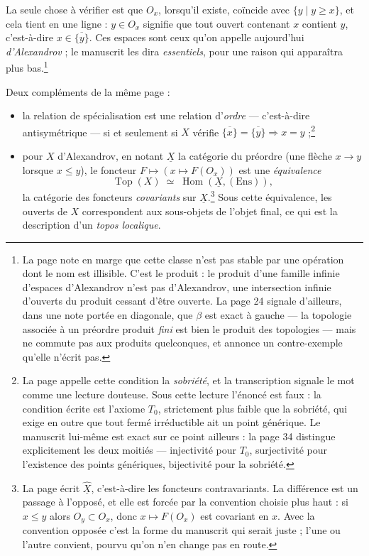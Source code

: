 \documentclass[11pt,a4paper]{article}
\begin{document}
La seule chose à vérifier est que $O_{x}$, lorsqu'il existe, coïncide avec
$\{y \mid y \geq x\}$, et cela tient en une ligne : $y \in O_{x}$ signifie que
tout ouvert contenant $x$ contient $y$, c'est-à-dire $x \in \overline{\{y\}}$.
Ces espaces sont ceux qu'on appelle aujourd'hui \emph{d'Alexandrov} ; le
manuscrit les dira \emph{essentiels}, pour une raison qui apparaîtra plus
bas.\footnote{La page note en marge que cette classe n'est pas stable par une
opération dont le nom est illisible. C'est le produit : le produit d'une
famille infinie d'espaces d'Alexandrov n'est pas d'Alexandrov, une
intersection infinie d'ouverts du produit cessant d'être ouverte. La page 24
signale d'ailleurs, dans une note portée en diagonale, que $\beta$ est exact à
gauche — la topologie associée à un préordre produit \emph{fini} est bien le
produit des topologies — mais ne commute pas aux produits quelconques, et
annonce un contre-exemple qu'elle n'écrit pas.}

Deux compléments de la même page :

\begin{itemize}
\item la relation de spécialisation est une relation d'\emph{ordre} — c'est-à-dire
antisymétrique — si et seulement si $X$ vérifie $\overline{\{x\}} =
\overline{\{y\}} \Rightarrow x = y$ ;\footnote{La page appelle cette condition
la \emph{sobriété}, et la transcription signale le mot comme une lecture
douteuse. Sous cette lecture l'énoncé est faux : la condition écrite est
l'axiome $T_{0}$, strictement plus faible que la sobriété, qui exige en outre
que tout fermé irréductible ait un point générique. Le manuscrit lui-même est
exact sur ce point ailleurs : la page 34 distingue explicitement les deux
moitiés — injectivité pour $T_{0}$, surjectivité pour l'existence des points
génériques, bijectivité pour la sobriété.}
\item pour $X$ d'Alexandrov, en notant $\underline{X}$ la catégorie du
préordre (une flèche $x \to y$ lorsque $x \leq y$), le foncteur
$F \mapsto (x \mapsto F(O_{x}))$ est une \emph{équivalence}
\[
\operatorname{Top}(X) \;\simeq\; \operatorname{Hom}(\underline{X},
(\mathrm{Ens})),
\]
la catégorie des foncteurs \emph{covariants} sur $\underline{X}$.\footnote{La
page écrit $\widehat{\underline{X}}$, c'est-à-dire les foncteurs
contravariants. La différence est un passage à l'opposé, et elle est forcée par
la convention choisie plus haut : si $x \leq y$ alors $O_{y} \subset O_{x}$,
donc $x \mapsto F(O_{x})$ est covariant en $x$. Avec la convention opposée
c'est la forme du manuscrit qui serait juste ; l'une ou l'autre convient,
pourvu qu'on n'en change pas en route.} Sous cette équivalence, les ouverts de
$X$ correspondent aux sous-objets de l'objet final, ce qui est la description
d'un \emph{topos localique}.
\end{itemize}
\end{document}

